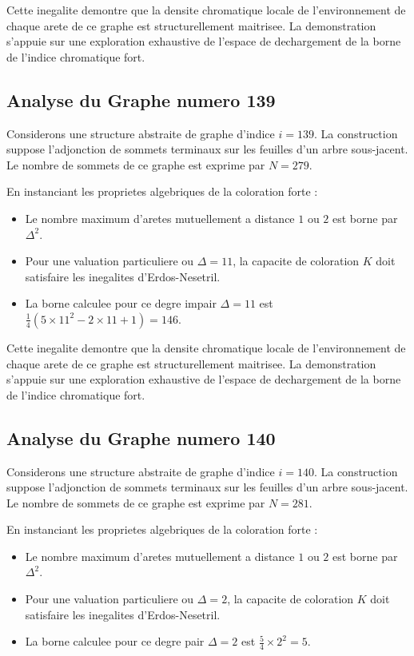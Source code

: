 \documentclass[11pt,a4paper]{article}
\begin{document}
Cette inegalite demontre que la densite chromatique locale de l'environnement de chaque arete de ce graphe est structurellement maitrisee. La demonstration s'appuie sur une exploration exhaustive de l'espace de dechargement de la borne de l'indice chromatique fort.

\subsection{Analyse du Graphe numero 139}
Considerons une structure abstraite de graphe d'indice $i = 139$. La construction suppose l'adjonction de sommets terminaux sur les feuilles d'un arbre sous-jacent. Le nombre de sommets de ce graphe est exprime par $N = 279$.

En instanciant les proprietes algebriques de la coloration forte :
\begin{itemize}
\item Le nombre maximum d'aretes mutuellement a distance $1$ ou $2$ est borne par $\Delta^2$.
\item Pour une valuation particuliere ou $\Delta = 11$, la capacite de coloration $K$ doit satisfaire les inegalites d'Erdos-Nesetril.
\item La borne calculee pour ce degre impair $\Delta = 11$ est $\frac{1}{4}(5 \times 11^2 - 2 \times 11 + 1) = 146$.
\end{itemize}

Cette inegalite demontre que la densite chromatique locale de l'environnement de chaque arete de ce graphe est structurellement maitrisee. La demonstration s'appuie sur une exploration exhaustive de l'espace de dechargement de la borne de l'indice chromatique fort.

\subsection{Analyse du Graphe numero 140}
Considerons une structure abstraite de graphe d'indice $i = 140$. La construction suppose l'adjonction de sommets terminaux sur les feuilles d'un arbre sous-jacent. Le nombre de sommets de ce graphe est exprime par $N = 281$.

En instanciant les proprietes algebriques de la coloration forte :
\begin{itemize}
\item Le nombre maximum d'aretes mutuellement a distance $1$ ou $2$ est borne par $\Delta^2$.
\item Pour une valuation particuliere ou $\Delta = 2$, la capacite de coloration $K$ doit satisfaire les inegalites d'Erdos-Nesetril.
\item La borne calculee pour ce degre pair $\Delta = 2$ est $\frac{5}{4} \times 2^2 = 5$.
\end{itemize}
\end{document}
